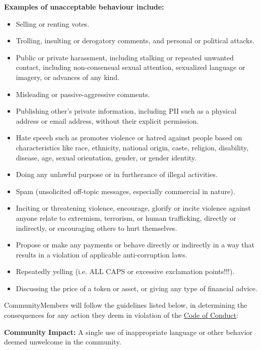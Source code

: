 \textbf{Examples of unacceptable behaviour include:}
\begin{itemize}
	\item Selling or renting votes.
	\item Trolling, insulting or derogatory comments, and personal or political attacks.
	\item Public or private harassment, including stalking or repeated unwanted contact, including non-consensual sexual attention, sexualized language or imagery, or advances of any kind.
	\item Misleading or passive-aggressive comments.
	\item Publishing other's private information, including \ac{PII} such as a physical address or email address, without their explicit permission.
	\item Hate speech such as promotes violence or hatred against people based on characteristics like race, ethnicity, national origin, caste, religion, disability, disease, age, sexual orientation, gender, or gender identity.
	\item Doing any unlawful purpose or in furtherance of illegal activities.
	\item Spam (unsolicited off-topic messages, especially commercial in nature).
	\item Inciting or threatening violence, encourage, glorify or incite violence against anyone relate to extremism, terrorism, or human trafficking, directly or indirectly, or encouraging others to hurt themselves.
	\item Propose or make any payments or behave directly or indirectly in a way that results in a violation of applicable anti-corruption laws.
	\item Repeatedly yelling (i.e. ALL CAPS or excessive exclamation points!!!).
	\item Discussing the price of a token or asset, or giving any type of financial advice.
\end{itemize}


\label{sec:ViolationsAndConsequences}
	
\glspl{CommunityMember} will follow the guidelines listed below, in determining the consequences for any action they deem in violation of the \hyperref[sec:CodeOfConduct]{Code of Conduct}:


	\textbf{Community Impact:} A single use of inappropriate language or other behavior deemed unwelcome in the community.
	
